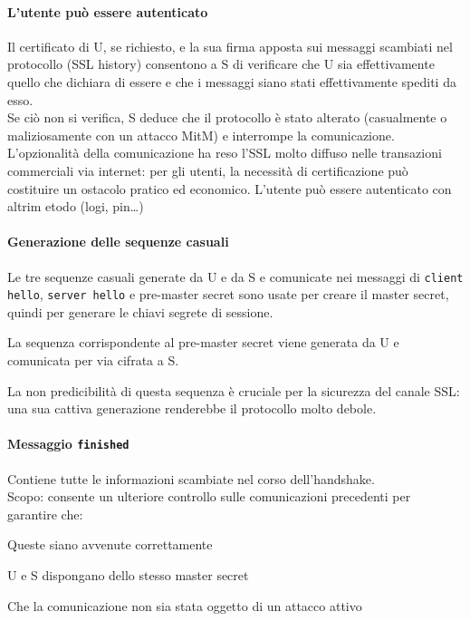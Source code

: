 \documentclass[10pt]{book}
\begin{document}
\paragraph{L'utente può essere autenticato} Il certificato di U, se richiesto, e la sua firma apposta sui messaggi scambiati nel protocollo (SSL history) consentono a S di verificare che U sia effettivamente quello che dichiara di essere e che i messaggi siano stati effettivamente spediti da esso.\\
Se ciò non si verifica, S deduce che il protocollo è stato alterato (casualmente o maliziosamente con un attacco MitM) e interrompe la comunicazione.\\
L'opzionalità della comunicazione ha reso l'SSL molto diffuso nelle transazioni commerciali via internet: per gli utenti, la necessità di certificazione può costituire un ostacolo pratico ed economico. L'utente può essere autenticato con altrim etodo (logi, pin\ldots)
\pagebreak
\paragraph{Generazione delle sequenze casuali} Le tre sequenze casuali generate da U e da S e comunicate nei messaggi di \texttt{client hello}, \texttt{server hello} e pre-master secret sono usate per creare il master secret, quindi per generare le chiavi segrete di sessione.
\begin{list}{}{}

	\item La sequenza corrispondente al pre-master secret viene
generata da U e comunicata per via cifrata a S.
	\item La non predicibilità di questa sequenza è cruciale per la
sicurezza del canale SSL:\\
	una sua cattiva generazione renderebbe il protocollo molto debole.
\end{list}
\paragraph{Messaggio \texttt{finished}} Contiene tutte le informazioni scambiate nel corso dell'handshake.\\
Scopo: consente un ulteriore controllo sulle comunicazioni precedenti per garantire che:
\begin{list}{}{}
	\item Queste siano avvenute correttamente
	\item U e S dispongano dello stesso master secret
	\item Che la comunicazione non sia stata oggetto di un attacco attivo
\end{list}
\end{document}
